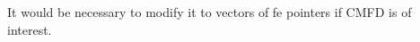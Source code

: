 
\begin{DoxyRefList}
\item[\label{todo__todo000001}%
\Hypertarget{todo__todo000001}%
Member \hyperlink{class_bart_driver_ac2e63d4ab8a403649e19f4b1acf94c04}{Bart\+Driver$<$ dim $>$\+:\+:fe} ]It would be necessary to modify it to vectors of fe pointers if C\+M\+FD is of interest. 
\end{DoxyRefList}